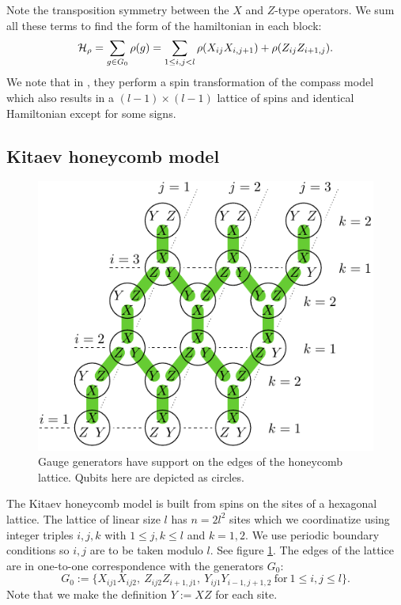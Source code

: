 \documentclass[12pt]{article}
\begin{document}
Note the transposition symmetry between the $X$ and $Z$-type operators.
We sum all these terms to find 
the form of the hamiltonian in each block:
$$
\mathcal{H}_\rho = \sum_{g\in G_0} \rho(g) = \sum_{1\le i,j<l} \rho(X_{ij}X_{i,j+1}) + \rho(Z_{ij}Z_{i+1,j}).
$$
We note that in \cite{Brzezicki2013}, they perform a
spin transformation of the compass model
which also results in a $(l-1)\times(l-1)$ lattice
of spins and identical Hamiltonian except for some signs.

%
%

\subsection{Kitaev honeycomb model}


\begin{figure}[th!]
\begin{center}
        \includegraphics[width=0.6\columnwidth]{fig_00.pdf}
\caption{
Gauge generators have support on the edges of the honeycomb lattice.
Qubits here are depicted as circles.
}
\label{honeycomb}
\end{center}
\end{figure}


The Kitaev honeycomb model \cite{Kitaev2006} is built from spins on
the sites of a hexagonal lattice. 
The lattice of linear size $l$ has $n=2l^2$ sites
which we coordinatize using integer triples $i, j, k$
with $1\le j, k\le l$ and $k=1, 2.$
We use periodic boundary conditions so $i, j$ are
to be taken modulo $l$.
See figure \ref{honeycomb}.
The edges of the lattice are in one-to-one
correspondence with the generators $G_0$:
$$
G_0 := \big\{X_{ij1}X_{ij2},\ Z_{ij2}Z_{i+1,j1},\ Y_{ij1}Y_{i-1,j+1,2}
\ \mbox{for}\ 1\le i,j\le l\big\}.
$$
Note that we make the definition $Y:=XZ$ for each site.
\end{document}

